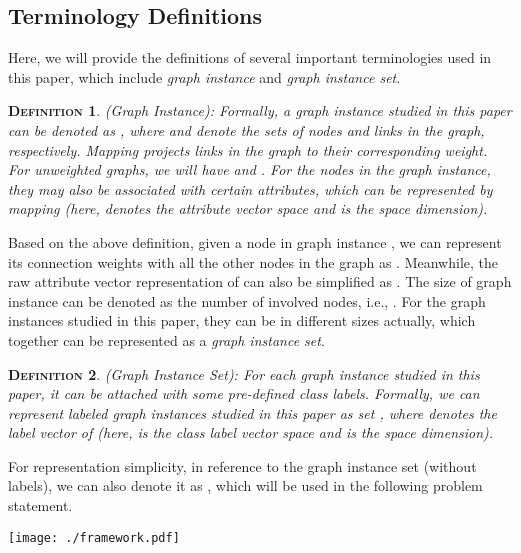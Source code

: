 \documentclass{article}
\newtheorem{definition}{\textsc{Definition}}
\newcommand{\our}{\textsc{Seg-Bert}}
\begin{document}
\subsection{Terminology Definitions}

Here, we will provide the definitions of several important terminologies used in this paper, which include \textit{graph instance} and \textit{graph instance set}.

\begin{definition}
(Graph Instance): Formally, a graph instance studied in this paper can be denoted as , where  and  denote the sets of nodes and links in the graph, respectively. Mapping  projects links in the graph to their corresponding weight. For unweighted graphs, we will have  and . For the nodes in the graph instance, they may also be associated with certain attributes, which can be represented by mapping  (here,  denotes the attribute vector space and  is the space dimension).
\end{definition}

Based on the above definition, given a node  in graph instance , we can represent its connection weights with all the other nodes in the graph as . Meanwhile, the raw attribute vector representation of  can also be simplified as . The size of graph instance  can be denoted as the number of involved nodes, i.e., . For the graph instances studied in this paper, they can be in different sizes actually, which together can be represented as a \textit{graph instance set}.

\begin{definition}
(Graph Instance Set): For each graph instance studied in this paper, it can be attached with some pre-defined class labels. Formally, we can represent  labeled graph instances studied in this paper as set , where  denotes the label vector of  (here,  is the class label vector space and  is the space dimension).
\end{definition}

For representation simplicity, in reference to the graph instance set (without labels), we can also denote it as , which will be used in the following problem statement.

\begin{figure*}[t]
    \begin{minipage}{\textwidth}
    \centering
    	\texttt{[image: ./framework.pdf]}
    	\caption{An Illustration of the {\our} Model for Graph Instance Representation Learning.}
    	\label{fig:architecture}
    \end{minipage}\vspace{-5pt}
\end{figure*}
\end{document}
